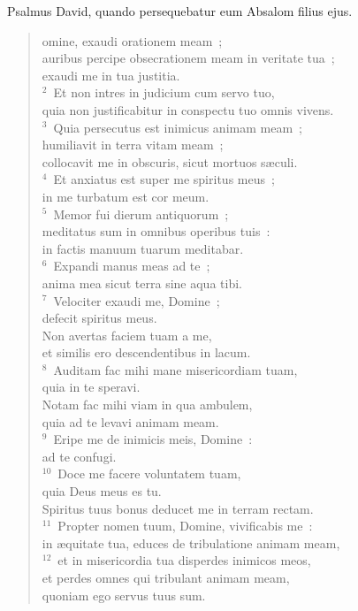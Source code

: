 \bchapter[Psalm]
Psalmus David, quando persequebatur eum Absalom filius ejus. \begin{verse}omine, exaudi orationem meam~;\\ auribus percipe obsecrationem meam in veritate tua~;\\ exaudi me in tua justitia.\\
${}^{2}$~Et non intres in judicium cum servo tuo,\\ quia non justificabitur in conspectu tuo omnis vivens.\\
${}^{3}$~Quia persecutus est inimicus animam meam~;\\ humiliavit in terra vitam meam~;\\ collocavit me in obscuris, sicut mortuos s\ae culi.\\
${}^{4}$~Et anxiatus est super me spiritus meus~;\\ in me turbatum est cor meum.\\
${}^{5}$~Memor fui dierum antiquorum~;\\ meditatus sum in omnibus operibus tuis~:\\ in factis manuum tuarum meditabar.\\
${}^{6}$~Expandi manus meas ad te~;\\ anima mea sicut terra sine aqua tibi.\\
${}^{7}$~Velociter exaudi me, Domine~;\\ defecit spiritus meus.\\ Non avertas faciem tuam a me,\\ et similis ero descendentibus in lacum.\\
${}^{8}$~Auditam fac mihi mane misericordiam tuam,\\ quia in te speravi.\\ Notam fac mihi viam in qua ambulem,\\ quia ad te levavi animam meam.\\
${}^{9}$~Eripe me de inimicis meis, Domine~:\\ ad te confugi.\\
${}^{10}$~Doce me facere voluntatem tuam,\\ quia Deus meus es tu.\\ Spiritus tuus bonus deducet me in terram rectam.\\
${}^{11}$~Propter nomen tuum, Domine, vivificabis me~:\\ in \ae quitate tua, educes de tribulatione animam meam,\\
${}^{12}$~et in misericordia tua disperdes inimicos meos,\\ et perdes omnes qui tribulant animam meam,\\ quoniam ego servus tuus sum.\end{verse}



